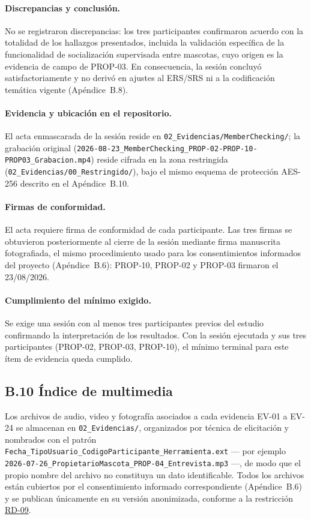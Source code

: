 \documentclass[journal,onecolumn]{IEEEtran}
\begin{document}
	\paragraph{Discrepancias y conclusión.}
	No se registraron discrepancias: los tres participantes confirmaron
	acuerdo con la totalidad de los hallazgos presentados, incluida la
	validación específica de la funcionalidad de socialización supervisada
	entre mascotas, cuyo origen es la evidencia de campo de PROP-03. En
	consecuencia, la sesión concluyó satisfactoriamente y no derivó en
	ajustes al ERS/SRS ni a la codificación temática vigente (Apéndice~B.8).

	\paragraph{Evidencia y ubicación en el repositorio.}
	El acta enmascarada de la sesión reside en
	\texttt{02\_Evidencias/MemberChecking/}; la grabación original
	(\texttt{2026-08-23\_MemberChecking\_PROP-02-PROP-10-PROP03\_Grabacion.mp4})
	reside cifrada en la zona restringida
	(\texttt{02\_Evidencias/00\_Restringido/}), bajo el mismo esquema de
	protección AES-256 descrito en el Apéndice~B.10.

	\paragraph{Firmas de conformidad.}
	El acta requiere
	firma de conformidad de cada participante. Las tres firmas se obtuvieron
	posteriormente al cierre de la sesión mediante firma manuscrita
	fotografiada, el mismo procedimiento usado para los consentimientos
	informados del proyecto (Apéndice~B.6): PROP-10, PROP-02 y PROP-03
	firmaron el 23/08/2026.

	\paragraph{Cumplimiento del mínimo exigido.}
	Se exige una sesión con al menos tres
	participantes previos del estudio confirmando la interpretación de los
	resultados. Con la sesión ejecutada y sus tres participantes (PROP-02,
	PROP-03, PROP-10), el mínimo terminal para este ítem de evidencia queda
	cumplido.

	\subsection*{B.10 Índice de multimedia}
	
	Los archivos de audio, video y fotografía asociados a cada evidencia EV-01 a
	EV-24 se almacenan en \texttt{02\_Evidencias/}, organizados por técnica de
	elicitación y nombrados con el patrón
	\texttt{Fecha\_TipoUsuario\_CodigoParticipante\_Herramienta.ext} --- por
	ejemplo \texttt{2026-07-26\_PropietarioMascota\_PROP-04\_Entrevista.mp3} ---,
	de modo que el propio nombre del archivo no constituya un dato identificable. Todos
	los archivos están cubiertos por el consentimiento informado correspondiente
	(Apéndice~B.6) y se publican únicamente en su versión anonimizada, conforme
	a la restricción \hyperref[tab:RD-09]{RD-09}.
	
\end{document}
